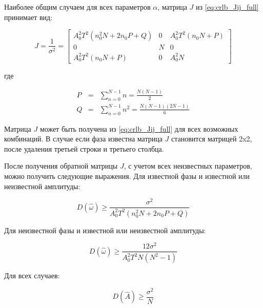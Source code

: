 Наиболее общим случаем для всех параметров ${\alpha}$, матрица ${J}$ из \ref{eq:crlb_Jij_full} принимает вид:
\begin{center}
\begin{equation}
	\label{eq:lpc_a_estimation}
	J = \frac{1}{\sigma^2} =
		\left[ \begin{array}{ccc}
			A_0^2 T^2 (n_0^2 N + 2n_0P + Q) & 0 & A_0^2 T^2 (n_0 N + P) \\
			0 & N & 0 \\
			A_0^2 T^2 (n_0 N + P) & 0 & A_0^2N
		\end{array} \right]
\end{equation}
\end{center}
где
\begin{center}
\begin{eqnarray}
	\label{eq:clrb_QP}
	P & = & \sum_{n=0}^{N-1}n = \frac{N(N-1)}{2} \\
	Q & = & \sum_{n=0}^{N-1}n^2 = \frac{N(N-1)(2N-1)}{6}
\end{eqnarray}
\end{center}

Матрица ${J}$ может быть получена из \ref{eq:crlb_Jij_full} для всех возможных комбинаций. В случае если фаза известна матрица ${J}$ становится матрицей 2x2, после удаления третьей строки
и третьего столбца.

После получения обратной матрицы ${J}$, с учетом всех неизвестных параметров, можно получить следующие выражения.
Для известной фазы и известной или неизвестной амплитуды:
\begin{center}
\begin{equation}
	\label{eq:clrb_est_omega_1}
	D(\hat{\omega}) \ge \frac{\sigma^2}{A_0^2 T^2 (n_0^2 N + 2n_0P + Q)}
\end{equation}
\end{center}

Для неизвестной фазы и известной или неизвестной амплитуды:
\begin{center}
\begin{equation}
	\label{eq:clrb_est_omega_2}
	D(\hat{\omega}) \ge \frac{12\sigma^2}{A_0^2 T^2N(N^2-1)}
\end{equation}
\end{center}

Для всех случаев:
\begin{center}
\begin{equation}
	\label{eq:clrb_est_b_1}
	D(\hat{A}) \ge \frac{\sigma^2}{N}
\end{equation}
\end{center}

